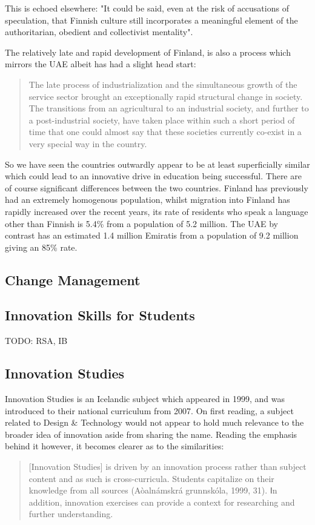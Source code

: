 This is echoed elsewhere: "It could be said, even at the risk of accusations of speculation, that Finnish culture still incorporates a meaningful element of the authoritarian, obedient and collectivist mentality". \cite{Simola2005}

The relatively late and rapid development of Finland, is also a process which mirrors the UAE albeit has had a slight head start:

\begin{quote}
The late process of industrialization and the simultaneous growth of the service sector brought an exceptionally rapid structural change in society. The transitions from an agricultural to an industrial society, and further to a post-industrial society, have taken place within such a short period of time that one could almost say that these societies currently co-exist in a very special way in the country.
\end{quote} \cite{Simola2005}

So we have seen the countries outwardly appear to be at least superficially similar which could lead to an innovative drive in education being successful. There are of course significant differences between the two countries. Finland has previously had an extremely homogenous population, whilst migration into Finland has rapidly increased over the recent years, its rate of residents who speak a language other than Finnish is 5.4\% from a population of 5.2 million. \cite{OfficialStatisticsofFinlandOSF2011} The UAE by contrast has an estimated 1.4 million Emiratis \cite{HABBOUSH2013}from a population of 9.2 million \cite{MalitJr.2013} giving an 85\% rate.

\subsection{Change Management}
\subsection{Innovation Skills for Students}
TODO: RSA, IB

\subsection{Innovation Studies}
Innovation Studies is an Icelandic subject which appeared in 1999, and was introduced to their national curriculum from 2007. On first reading, a subject related to Design & Technology would not appear to hold much relevance to the broader idea of innovation aside from sharing the name. Reading the emphasis behind it however, it becomes clearer as to the similarities:
\begin{quote}
[Innovation Studies] is driven by an innovation process rather than subject content and as such is cross-curricula. Students capitalize on their knowledge from all sources (Aòalnámskrá grunnskóla, 1999, 31). Ⅰn addition, innovation exercises can provide a context for researching and further understanding.
\end{quote} \cite{thorsteinsson2005innovation}

